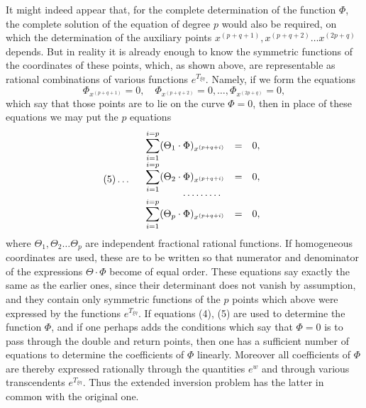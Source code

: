 \documentclass[10pt]{article}
\begin{document}
It might indeed appear that, for the complete determination of the function \(\Phi\), the complete solution of the equation of degree \(p\) would also be required, on which the determination of the auxiliary points \(x^{(p+q+1)},x^{(p+q+2)}\ldots x^{(2p+q)}\) depends. But in reality it is already enough to know the symmetric functions of the coordinates of these points, which, as shown above, are representable as rational combinations of various functions \(e^{T_{\xi\eta}}\). Namely, if we form the equations
\[
\Phi_{x^{(p+q+1)}}=0,\quad
\Phi_{x^{(p+q+2)}}=0,\ldots,
\Phi_{x^{(2p+q)}}=0,
\]
which say that those points are to lie on the curve \(\Phi=0\), then in place of these equations we may put the \(p\) equations
\[
(5)\ldots\quad
\begin{array}{rcl}
\displaystyle\sum_{i=1}^{i=p}(\Theta_1\cdot\Phi)_{x^{(p+q+i)}}&=&0,\\
\displaystyle\sum_{i=1}^{i=p}(\Theta_2\cdot\Phi)_{x^{(p+q+i)}}&=&0,\\[-0.3em]
\multicolumn{3}{c}{\cdots\cdots\cdots}\\[-0.3em]
\displaystyle\sum_{i=1}^{i=p}(\Theta_p\cdot\Phi)_{x^{(p+q+i)}}&=&0,
\end{array}
\]
where \(\Theta_1,\Theta_2\ldots\Theta_p\) are independent fractional rational functions. If homogeneous coordinates are used, these are to be written so that numerator and denominator of the expressions \(\Theta\cdot\Phi\) become of equal order. These equations say exactly the same as the earlier ones, since their determinant does not vanish by assumption, and they contain only symmetric functions of the \(p\) points which above were expressed by the functions \(e^{T_{\xi\eta}}\). If equations (4), (5) are used to determine the function \(\Phi\), and if one perhaps adds the conditions which say that \(\Phi=0\) is to pass through the double and return points, then one has a sufficient number of equations to determine the coefficients of \(\Phi\) linearly. Moreover all coefficients of \(\Phi\) are thereby expressed rationally through the quantities \(e^w\) and through various transcendents \(e^{T_{\xi\eta}}\). Thus the extended inversion problem has the latter in common with the original one.
\end{document}

